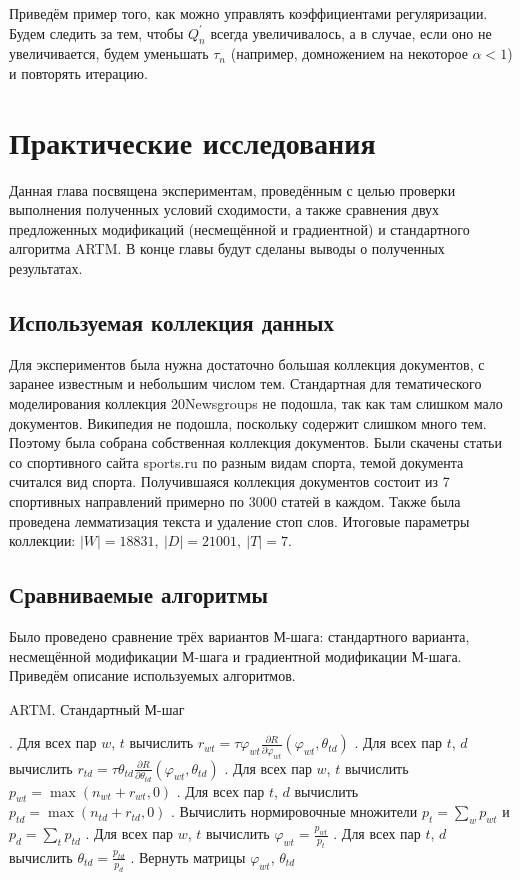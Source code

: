 \documentclass[12pt]{article}
\newenvironment{rusalgorithm}[1][htb]
  {\renewcommand{\algorithmcfname}{Алгоритм}
   \begin{algorithm}[#1]
  }{\end{algorithm}}
\renewcommand{\phi}{\varphi}
\begin{document}
Приведём пример того, как можно управлять коэффициентами регуляризации. Будем следить за тем, чтобы $Q^{\prime}_n$ всегда увеличивалось, а в случае, если оно не увеличивается, будем уменьшать $\tau_n$ (например, домножением на некоторое $\alpha < 1$) и повторять итерацию.

	\section{Практические исследования}
Данная глава посвящена экспериментам, проведённым с целью проверки выполнения полученных условий сходимости, а также сравнения двух предложенных модификаций (несмещённой и градиентной) и стандартного алгоритма ARTM. В конце  главы будут сделаны выводы о полученных результатах.
\subsection{Используемая коллекция данных}
Для экспериментов была нужна достаточно большая коллекция документов, с заранее известным  и небольшим числом тем. Стандартная для тематического моделирования  коллекция 20Newsgroups не подошла, так как там слишком мало документов. Википедия не подошла, поскольку содержит слишком много тем. Поэтому была собрана собственная коллекция документов. Были скачены статьи со спортивного сайта sports.ru по разным видам спорта, темой документа считался вид спорта. Получившаяся коллекция документов состоит из 7 спортивных направлений примерно по 3000 статей в каждом. Также была проведена лемматизация текста и удаление стоп слов. Итоговые параметры коллекции: $|W| = 18831,~|D| = 21001,~|T| = 7$.
	\subsection{Сравниваемые алгоритмы}
Было проведено сравнение трёх вариантов М-шага: стандартного варианта, несмещённой модификации М-шага и градиентной модификации М-шага. Приведём описание используемых алгоритмов.

\begin{rusalgorithm}[H]
\caption{ARTM. Стандартный М-шаг}\label{malgo1}
\begin{algorithmic}[]
\Procedure{MStep}{$n_{wt}$, $n_{td}$, $\phi_{wt}$, $\theta_{td}$}
. Для всех пар $w$, $t$ вычислить $r_{wt} = \tau \phi_{wt} \frac{\partial{R}}{\partial{\phi_{wt}}}(\phi_{wt}, \theta_{td})$
. Для всех пар $t$, $d$ вычислить $r_{td} =\tau  \theta_{td} \frac{\partial{R}}{\partial{\theta_{td}}}(\phi_{wt}, \theta_{td})$
. Для всех пар $w$, $t$ вычислить $p_{wt} = \max(n_{wt} + r_{wt}, 0)$
. Для всех пар $t$, $d$ вычислить $p_{td} = \max(n_{td} + r_{td}, 0)$
. Вычислить нормировочные множители $p_t = \sum_w p_{wt}$ и $p_d = \sum_t p_{td}$
. Для всех пар $w$, $t$ вычислить $\phi_{wt} = \frac{p_{wt}}{p_t}$
. Для всех пар $t$, $d$ вычислить $\theta_{td} = \frac{p_{td}}{p_d}$
. Вернуть матрицы $\phi_{wt}$, $\theta_{td}$
\EndProcedure
\end{algorithmic}
\end{rusalgorithm}
\end{document}
